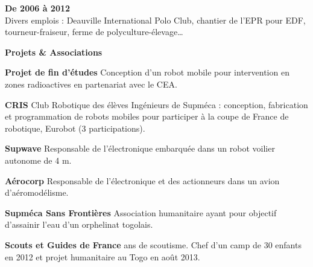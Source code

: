 \documentclass[a4paper,11pt,final]{memoir}
\newcommand{\Sep}{\vspace{1.5em}}
\newcommand{\SmallSep}{\vspace{0.5em}}
\newcommand{\CVSection}[1]
	{\Large\textbf{#1}\par
	\SmallSep\normalsize\normalfont}
\newcommand{\CVItem}[2]
	{\textbf{\color{RoyalBlue} #1 \color{dark_gray} #2}\normalsize\normalfont}
\begin{document}
\CVItem{De 2006 à 2012}{}\\
Divers emplois : Deauville International Polo Club, chantier de l'EPR pour EDF, tourneur-fraiseur, ferme de polyculture-élevage\ldots
\Sep

\CVSection{Projets \& Associations}
\CVItem{Projet de fin d'études}{} Conception d'un robot mobile pour intervention en zones radioactives en partenariat avec le CEA.
\SmallSep

\CVItem{CRIS}{}
Club Robotique des élèves Ingénieurs de Supméca : conception, fabrication et programmation de robots mobiles pour participer à la coupe de France de robotique, Eurobot (3 participations).
\SmallSep

\CVItem{Supwave}{}
Responsable de l'électronique embarquée dans un robot voilier autonome de 4 m.
\SmallSep

\CVItem{Aérocorp}{}
Responsable de l'électronique et des actionneurs dans un avion d'aéromodélisme.
\SmallSep

\CVItem{Supméca Sans Frontières}{}
Association humanitaire ayant pour objectif d'assainir l'eau d'un orphelinat togolais.
\SmallSep

\CVItem{Scouts et Guides de France}{}
8 ans de scoutisme. Chef d'un camp de 30 enfants en 2012 et projet humanitaire au Togo en août 2013.

\end{document}

